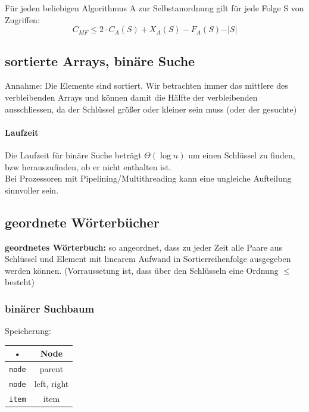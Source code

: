 \documentclass{scrartcl}
\begin{document}
\begin{shaded}
Für jeden beliebigen Algorithmus A zur Selbstanordnung gilt für jede Folge S von Zugriffen:
\[ C_{MF} \leq 2\cdot C_A(S)+X_A(S)-F_A(S)-\vert S\vert \] 
\end{shaded}

\subsection{sortierte Arrays, binäre Suche}
Annahme: Die Elemente sind sortiert. Wir betrachten immer das mittlere des verbleibenden Arrays und können damit die Hälfte der verbleibenden ausschliessen, da der Schlüssel größer oder kleiner sein muss (oder der gesuchte)
\paragraph{Laufzeit}
Die Laufzeit für binäre Suche beträgt $\Theta(\log n)$ um einen Schlüssel zu finden, bzw herauszufinden, ob er nicht enthalten ist.\\
Bei Prozessoren mit Pipelining/Multithreading kann eine ungleiche Aufteilung sinnvoller sein.

\subsection{geordnete Wörterbücher}
\begin{shaded}
\textbf{geordnetes Wörterbuch:} so angeordnet, dass zu jeder Zeit alle Paare aus Schlüssel und Element mit linearem Aufwand in Sortierreihenfolge ausgegeben werden können. {\tiny (Vorraussetung ist, dass über den Schlüsseln eine Ordnung $\leq$ besteht)}
\end{shaded}
\subsubsection{binärer Suchbaum}
Speicherung:\begin{tabular}{|c|c|}
\hline • & Node \\ 
\hline \hline \texttt{node} & parent \\ 
\hline \texttt{node} & left, right \\ 
\hline \texttt{item} & item \\ 
\hline 
\end{tabular}
\end{document}
